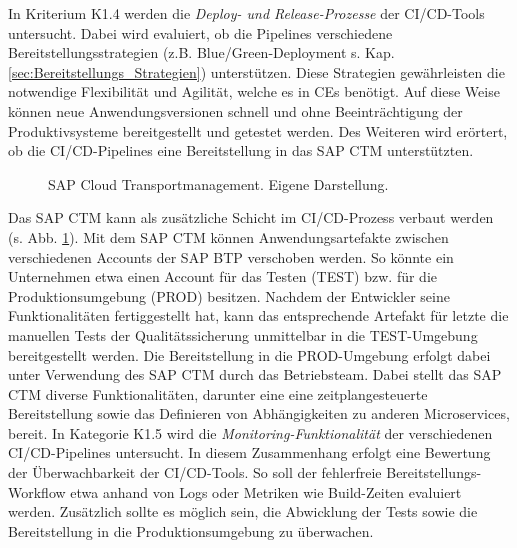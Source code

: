 In Kriterium K1.4 werden die \textit{Deploy- und Release-Prozesse} der CI/CD-Tools untersucht. Dabei wird evaluiert, ob die Pipelines verschiedene Bereitstellungsstrategien (z.B. Blue/Green-Deployment s. Kap. \ref{sec:Bereitstellungs_Strategien}) unterstützen. Diese Strategien gewährleisten die notwendige Flexibilität und Agilität, welche es in CEs benötigt. Auf diese Weise können neue Anwendungsversionen schnell und ohne Beeinträchtigung der Produktivsysteme bereitgestellt und getestet werden. Des Weiteren wird erörtert, ob die CI/CD-Pipelines eine Bereitstellung in das \ac{SAP CTM} unterstützten.
\begin{center}
	\begin{figure}[H]
		\centering
		\caption[SAP Cloud Transportmanagement]{SAP Cloud Transportmanagement. Eigene Darstellung.}
		\label{fig:CTM}
	\end{figure}
\end{center}
\vspace*{-10mm}
Das SAP CTM kann als zusätzliche Schicht im CI/CD-Prozess verbaut werden (s. Abb. \ref{fig:CTM}). Mit dem SAP CTM können Anwendungsartefakte zwischen verschiedenen Accounts der SAP BTP verschoben werden. So könnte ein Unternehmen etwa einen Account für das Testen (TEST) bzw. für die Produktionsumgebung (PROD) besitzen. Nachdem der Entwickler seine Funktionalitäten fertiggestellt hat, kann das entsprechende Artefakt für letzte die manuellen Tests der Qualitätssicherung unmittelbar in die TEST-Umgebung bereitgestellt werden. Die Bereitstellung in die PROD-Umgebung erfolgt dabei unter Verwendung des SAP CTM durch das Betriebsteam. Dabei stellt das SAP CTM diverse Funktionalitäten, darunter eine eine zeitplangesteuerte Bereitstellung sowie das Definieren von Abhängigkeiten zu anderen Microservices, bereit.  
In Kategorie K1.5 wird die \textit{Monitoring-Funktionalität} der verschiedenen CI/CD-Pipelines untersucht. In diesem Zusammenhang erfolgt eine Bewertung der Überwachbarkeit der CI/CD-Tools. So soll der fehlerfreie Bereitstellungs-Workflow etwa anhand von Logs oder Metriken wie Build-Zeiten evaluiert werden. Zusätzlich sollte es möglich sein, die Abwicklung der Tests sowie die Bereitstellung in die Produktionsumgebung zu überwachen.\\

